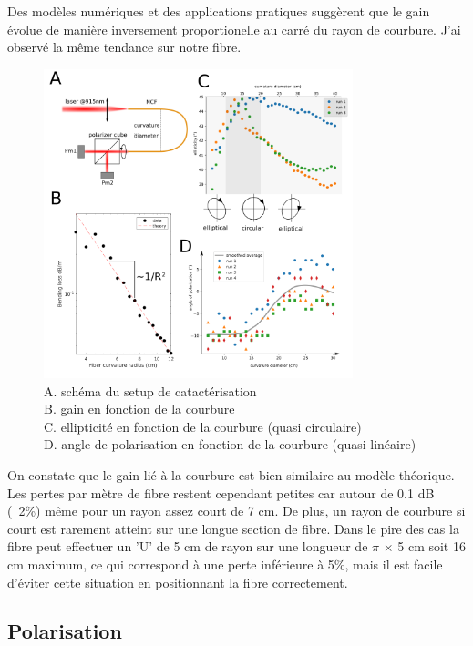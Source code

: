 Des modèles numériques \cite{yu_negative_2016} \cite{setti_flexible_2013} et des applications pratiques suggèrent que le gain évolue de manière inversement proportionelle au carré du rayon de courbure. J'ai observé la même tendance sur notre fibre.

\begin{figure}
\centering
\includegraphics[width=0.8\textwidth]{./files/fiber_bending.png}
\caption{A. schéma du setup de catactérisation
\\ B. gain en fonction de la courbure
\\ C. ellipticité en fonction de la courbure (quasi circulaire)
\\ D. angle de polarisation en fonction de la courbure (quasi linéaire)}
\end{figure}



On constate que le gain lié à la courbure est bien similaire au modèle théorique. Les pertes par mètre de fibre restent cependant petites car autour de 0.1 dB (~2\%) même pour un rayon assez court de 7 cm. De plus, un rayon de courbure si court est rarement atteint sur une longue section de fibre. Dans le pire des cas la fibre peut effectuer un 'U' de 5 cm de rayon sur une longueur de $\pi$ × 5 cm soit 16 cm maximum, ce qui correspond à une perte inférieure à 5\%, mais il est facile d'éviter cette situation en positionnant la fibre correctement. 

\subsection{Polarisation}

